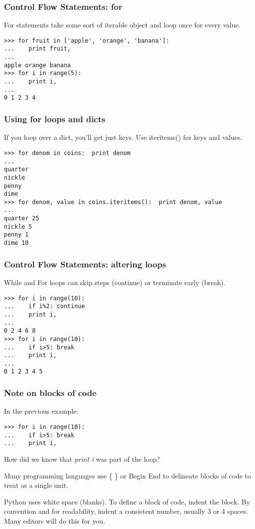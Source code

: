 \documentclass[10pt]{beamer}
\begin{document}
\begin{frame}[fragile]
\frametitle{Control Flow Statements: for}

For statements take some sort of iterable object and loop once for 
every value.

\begin{verbatim}
>>> for fruit in ['apple', 'orange', 'banana']:
...    print fruit, 
... 
apple orange banana
>>> for i in range(5):
...    print i,
... 
0 1 2 3 4 

\end{verbatim}

\end{frame}

\begin{frame}[fragile]
\frametitle{Using for loops and dicts}
If you loop over a dict, you'll get just keys.  Use iteritems() for keys and values.

\begin{verbatim}
>>> for denom in coins:  print denom
... 
quarter
nickle
penny
dime
>>> for denom, value in coins.iteritems():  print denom, value
... 
quarter 25
nickle 5
penny 1
dime 10

\end{verbatim}
\end{frame}


\begin{frame}[fragile]
\frametitle{Control Flow Statements: altering loops}

While and For loops can skip steps (continue) or terminate early (break).

\begin{verbatim}
>>> for i in range(10):
...    if i%2: continue
...    print i, 
... 
0 2 4 6 8
>>> for i in range(10):
...    if i>5: break
...    print i,
... 
0 1 2 3 4 5
\end{verbatim}

\end{frame}

\begin{frame}[fragile]
\frametitle{Note on blocks of code}

In the previous example:
\begin{verbatim}
>>> for i in range(10):
...    if i>5: break
...    print i,
\end{verbatim}

How did we know that \textit{print i} was part of the loop?

Many programming languages use \{ \} or Begin End to delineate blocks of
code to treat as a single unit.

Python uses white space (blanks).  To define a block of code, indent the block.
By convention and for readability, indent a consistent number, 
usually 3 or 4 spaces.  Many editors will do this for you.

\end{frame}
\end{document}
